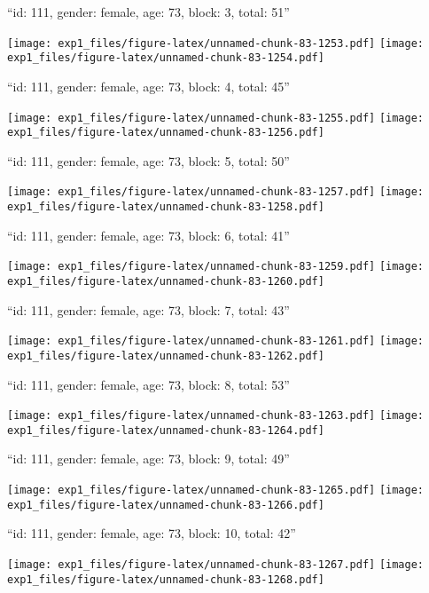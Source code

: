 \documentclass[11pt,,]{article}
\begin{document}
\newpage
[1] 

``id: 111, gender: female, age: 73, block: 3, total: 51''

\texttt{[image: exp1\_files/figure-latex/unnamed-chunk-83-1253.pdf]}
\texttt{[image: exp1\_files/figure-latex/unnamed-chunk-83-1254.pdf]}

\newpage
[1] 

``id: 111, gender: female, age: 73, block: 4, total: 45''

\texttt{[image: exp1\_files/figure-latex/unnamed-chunk-83-1255.pdf]}
\texttt{[image: exp1\_files/figure-latex/unnamed-chunk-83-1256.pdf]}

\newpage
[1] 

``id: 111, gender: female, age: 73, block: 5, total: 50''

\texttt{[image: exp1\_files/figure-latex/unnamed-chunk-83-1257.pdf]}
\texttt{[image: exp1\_files/figure-latex/unnamed-chunk-83-1258.pdf]}

\newpage
[1] 

``id: 111, gender: female, age: 73, block: 6, total: 41''

\texttt{[image: exp1\_files/figure-latex/unnamed-chunk-83-1259.pdf]}
\texttt{[image: exp1\_files/figure-latex/unnamed-chunk-83-1260.pdf]}

\newpage
[1] 

``id: 111, gender: female, age: 73, block: 7, total: 43''

\texttt{[image: exp1\_files/figure-latex/unnamed-chunk-83-1261.pdf]}
\texttt{[image: exp1\_files/figure-latex/unnamed-chunk-83-1262.pdf]}

\newpage
[1] 

``id: 111, gender: female, age: 73, block: 8, total: 53''

\texttt{[image: exp1\_files/figure-latex/unnamed-chunk-83-1263.pdf]}
\texttt{[image: exp1\_files/figure-latex/unnamed-chunk-83-1264.pdf]}

\newpage
[1] 

``id: 111, gender: female, age: 73, block: 9, total: 49''

\texttt{[image: exp1\_files/figure-latex/unnamed-chunk-83-1265.pdf]}
\texttt{[image: exp1\_files/figure-latex/unnamed-chunk-83-1266.pdf]}

\newpage
[1] 

``id: 111, gender: female, age: 73, block: 10, total: 42''

\texttt{[image: exp1\_files/figure-latex/unnamed-chunk-83-1267.pdf]}
\texttt{[image: exp1\_files/figure-latex/unnamed-chunk-83-1268.pdf]}
\end{document}
